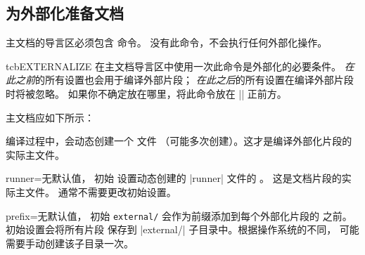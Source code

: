\clearpage
\subsection{为外部化准备文档}\label{subsec:external_preparation}

主文档的导言区必须包含  命令。
没有此命令，不会执行任何外部化操作。

\begin{docCommand}[doc new=2015-03-11]{tcbEXTERNALIZE}{}
  在主文档导言区中使用一次此命令是外部化的必要条件。
  \emph{在此之前}的所有设置也会用于编译外部片段；
  \emph{在此之后}的所有设置在编译外部片段时将被忽略。
  如果你不确定放在哪里，将此命令放在 || 正前方。

  主文档应如下所示：

\end{docCommand}

编译过程中，会动态创建一个  文件
（可能多次创建）。这才是编译外部化片段的实际主文件。

\begin{extTcbKey}[][doc new=2015-03-11]{runner}{=}{无默认值，
  初始 \texttt{}}
设置动态创建的 |runner| 文件的 。
这是文档片段的实际主文件。
通常不需要更改初始设置。
\begin{dispListing}
\end{dispListing}
\end{extTcbKey}

\begin{extTcbKey}[][doc new=2015-03-11]{prefix}{=}{无默认值，
  初始 \texttt{external/}}
会作为前缀添加到每个外部化片段的
 之前。初始设置会将所有片段
保存到 |external/| 子目录中。根据操作系统的不同，
可能需要手动创建该子目录一次。
\begin{dispListing}
\end{dispListing}
\end{extTcbKey}


